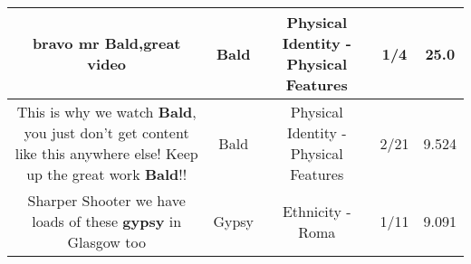 \documentclass[11pt]{article}
\newlength\mylength
\begin{document}
\begin{center}
\begin{longtable}{|C{.65\mylength}|C{.30\mylength}|C{.12\mylength}|C{.12\mylength}|C{.12\mylength}|}
  \small bravo mr \textbf{Bald},great video\normalsize   & Bald & Physical Identity - Physical Features & 1/4 & 25.0 \\  \hline
  \small This is why we watch \textbf{Bald}, you just don't get content like this anywhere else! Keep up the great work \textbf{Bald}!!\normalsize   & Bald & Physical Identity - Physical Features & 2/21 & 9.524 \\  \hline
  \small Sharper Shooter we have loads of these \textbf{gypsy} in Glasgow too\normalsize   & Gypsy & Ethnicity - Roma & 1/11 & 9.091 \\  \hline

\end{longtable}
\end{center}
\end{document}
